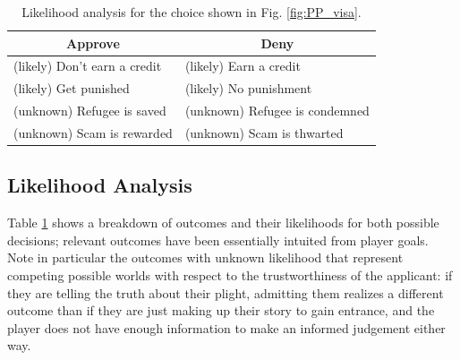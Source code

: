 \documentclass[arts,article,submit,moreauthors,pdftex,10pt,a4paper]{Definitions/mdpi}
\begin{document}
\begin{table}[H]
\centering
\begin{tabular}{l l}
  \toprule
  \multicolumn{1}{c}{\textbf{Approve}} & \multicolumn{1}{c}{\textbf{Deny}} \\
  \midrule
  (likely) Don't earn a credit & (likely) Earn a credit \\
  (likely) Get punished & (likely) No punishment \\
  (unknown) Refugee is saved & (unknown) Refugee is condemned \\
  (unknown) Scam is rewarded & (unknown) Scam is thwarted \\
  \bottomrule
\end{tabular}
\caption[\emph{Papers Please} likelihood analysis]{Likelihood analysis for the choice shown in Fig. \ref{fig:PP_visa}.}
\label{tab:PP_likelihoods}
\end{table}

\subsection{Likelihood Analysis}

Table \ref{tab:PP_likelihoods} shows a breakdown of outcomes and their likelihoods for both possible decisions; relevant outcomes have been essentially intuited from player goals.
%
Note in particular the outcomes with unknown likelihood that represent competing possible worlds with respect to the trustworthiness of the applicant: if they are telling the truth about their plight, admitting them realizes a different outcome than if they are just making up their story to gain entrance, and the player does not have enough information to make an informed judgement either way.
\end{document}
